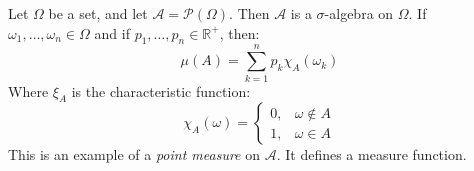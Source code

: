 \documentclass[crop=false,class=book,oneside]{standalone}
\begin{document}
            \begin{example}
                Let $\Omega$ be a set, and let
                $\mathcal{A}=\mathcal{P}(\Omega)$. Then
                $\mathcal{A}$ is a $\sigma$-algebra on $\Omega$.
                If $\omega_{1},\hdots,\omega_{n}\in\Omega$ and if
                $p_{1},\hdots,p_{n}\in\mathbb{R}^{+}$, then:
                \begin{equation}
                    \mu(A)=\sum_{k=1}^{n}p_{k}\chi_{A}(\omega_{k})
                \end{equation}
                Where $\xi_{A}$ is the characteristic function:
                \begin{equation}
                    \chi_{A}(\omega)=
                    \begin{cases}
                        0,&\omega\notin{A}\\
                        1,&\omega\in{A}
                    \end{cases}
                \end{equation}
                This is an example of a \textit{point measure}
                on $\mathcal{A}$. It defines a measure function.
            \end{example}
\end{document}
